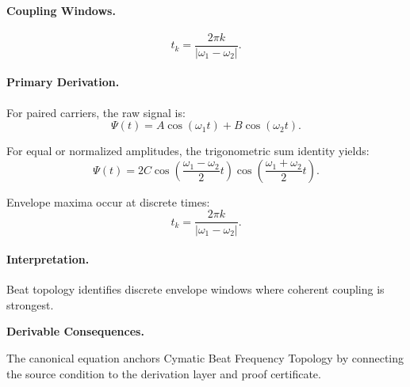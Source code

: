 \paragraph{Coupling Windows.}
\begin{equation}
t_k=
\frac{2\pi k}{|\omega_1-\omega_2|}.
\end{equation}

\paragraph{Primary Derivation.}
For paired carriers, the raw signal is:
\begin{equation}
\Psi(t)=A\cos(\omega_1t)+B\cos(\omega_2t).
\end{equation}

For equal or normalized amplitudes, the trigonometric sum identity yields:
\begin{equation}
\Psi(t)
=
2C
\cos\left(
\frac{\omega_1-\omega_2}{2}t
\right)
\cos\left(
\frac{\omega_1+\omega_2}{2}t
\right).
\end{equation}

Envelope maxima occur at discrete times:
\begin{equation}
\boxed{
t_k=
\frac{2\pi k}{|\omega_1-\omega_2|}.
}
\end{equation}

\paragraph{Interpretation.}
Beat topology identifies discrete envelope windows where coherent coupling is strongest.

\par\vspace{0.35em}
\noindent\textbf{Derivable Consequences.}\quad
\begingroup
\footnotesize
\raggedright
The canonical equation anchors Cymatic Beat Frequency Topology by connecting the source condition to the derivation layer and proof certificate.
\par\endgroup

